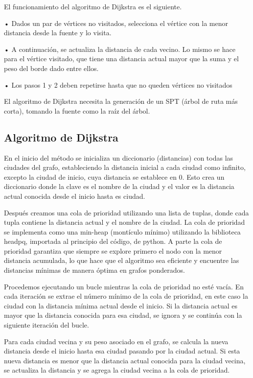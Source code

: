 \documentclass[12pt,oneside]{book}
\begin{document}
El funcionamiento del algoritmo de Dijkstra es el siguiente.

    • Dados un par de vértices no visitados, selecciona el vértice con la menor distancia desde la fuente y lo visita.
    
    • A continuación, se actualiza la distancia de cada vecino. Lo mismo se hace para el vértice visitado, que tiene una distancia actual mayor que la suma y el peso del borde dado entre ellos.
    
    • Los pasos 1 y 2 deben repetirse hasta que no queden vértices no visitados
    
El algoritmo de Dijkstra necesita la generación de un SPT (árbol de ruta más corta), tomando la fuente como la raíz del árbol. 
    \subsection{Algoritmo de Dijkstra}
En el inicio del método se inicializa un diccionario (distancias) con todas las ciudades del grafo, estableciendo la distancia inicial a cada ciudad como infinito, excepto la ciudad de inicio, cuya distancia se establece en 0. Esto crea un diccionario donde la clave es el nombre de la ciudad y el valor es la distancia actual conocida desde el inicio hasta es ciudad.

Después creamos una cola de prioridad utilizando una lista de tuplas, donde cada tupla contiene la distancia actual y el nombre de la ciudad. La cola de prioridad se implementa como una min-heap (montículo mínimo) utilizando la biblioteca headpq, importada al principio del código, de python. A parte la cola de prioridad garantiza que siempre se explore primero el nodo con la menor distancia acumulada, lo que hace que el algoritmo sea eficiente y encuentre las distancias mínimas de manera óptima en grafos ponderados.

Procedemos ejecutando un bucle mientras la cola de prioridad no esté vacía. En cada iteración se extrae el número mínimo de la cola de prioridad, en este caso la ciudad con la distancia mínima actual desde el inicio. Si la distancia actual es mayor que la distancia conocida para esa ciudad, se ignora y se continúa con la siguiente iteración del bucle.

Para cada ciudad vecina y su peso asociado en el grafo, se calcula la nueva distancia desde el inicio hasta esa ciudad pasando por la ciudad actual. Si esta nueva distancia es menor que la distancia actual conocida para la ciudad vecina, se actualiza la distancia y se agrega la ciudad vecina a la cola de prioridad.
\end{document}
